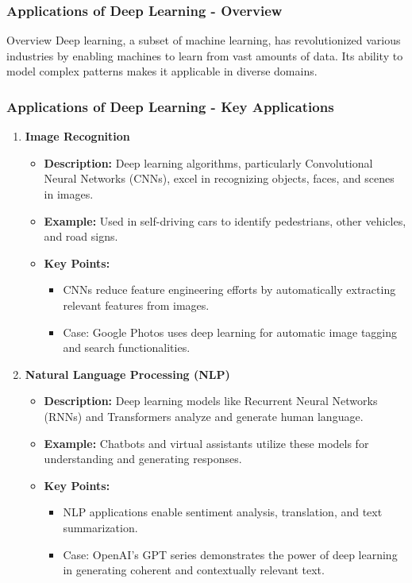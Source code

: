 \documentclass[aspectratio=169]{beamer}
\begin{document}
\begin{frame}[fragile]
  \frametitle{Applications of Deep Learning - Overview}
  \begin{block}{Overview}
      Deep learning, a subset of machine learning, has revolutionized various industries by enabling machines to learn from vast amounts of data. Its ability to model complex patterns makes it applicable in diverse domains.
  \end{block}
\end{frame}

\begin{frame}[fragile]
  \frametitle{Applications of Deep Learning - Key Applications}
  \begin{enumerate}
    \item \textbf{Image Recognition}
      \begin{itemize}
          \item \textbf{Description:} Deep learning algorithms, particularly Convolutional Neural Networks (CNNs), excel in recognizing objects, faces, and scenes in images.
          \item \textbf{Example:} Used in self-driving cars to identify pedestrians, other vehicles, and road signs.
          \item \textbf{Key Points:}
            \begin{itemize}
                \item CNNs reduce feature engineering efforts by automatically extracting relevant features from images.
                \item Case: Google Photos uses deep learning for automatic image tagging and search functionalities.
            \end{itemize}
      \end{itemize}

    \item \textbf{Natural Language Processing (NLP)}
      \begin{itemize}
          \item \textbf{Description:} Deep learning models like Recurrent Neural Networks (RNNs) and Transformers analyze and generate human language.
          \item \textbf{Example:} Chatbots and virtual assistants utilize these models for understanding and generating responses.
          \item \textbf{Key Points:}
            \begin{itemize}
                \item NLP applications enable sentiment analysis, translation, and text summarization.
                \item Case: OpenAI's GPT series demonstrates the power of deep learning in generating coherent and contextually relevant text.
            \end{itemize}
      \end{itemize}
  \end{enumerate}
\end{frame}
\end{document}
